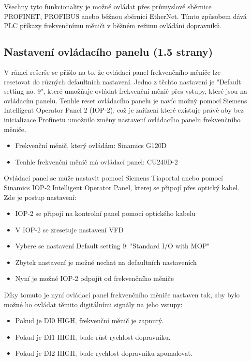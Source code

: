 Všechny tyto funkcionality je možné ovládat přes průmyslové sběrnice PROFINET, PROFIBUS anebo běžnou sběrnicí EtherNet. Tímto způsobem dává PLC příkazy frekvenčnímu měniči v běžném režimu ovládání dopravníků.

\oldtext

\subsection{Nastavení ovládacího panelu (1.5 strany)}\label{sec:NastaveniOvladacihoPanelu}

V rámci rešerše se přišlo na to, že ovládací panel frekvenčního měniče lze resetovat do různých defaultních nastavení. Jedno z těchto nastavení je "Default setting no. 9", které umožňuje ovládat frekvenční měnič přes vstupy, které jsou na ovládacím panelu. Tenhle reset ovládacího panelu je navíc možný pomocí Siemens Intelligent Operator Panel 2 (IOP-2), což je zařízení které existuje právě aby bez inicializace Profinetu umožnilo změny nastavení ovládacího panelu frekvenčního měniče.


\begin{itemize}
	\item Frekvenční měnič, který ovládám: Sinamics G120D
	\item Tenhle frekvenční měnič má ovládací panel: CU240D-2 \cite{SiemensG120DGettingStarted}
\end{itemize}


Ovládací panel se může nastavit pomocí Siemens Tiaportal anebo pomocí Sinamics IOP‑2 Intelligent Operator Panel, kterej se připojí přes optický kabel. Zde je postup nastavení:\cite{SiemensG120DGettingStarted}
\begin{itemize}
    \item IOP-2 se připojí na kontrolní panel pomocí optického kabelu
    \item V IOP-2 se zresetuje nastavení VFD
    \item Vybere se nastavení Default setting 9: "Standard I/O with MOP"
    \item Zbytek nastavení je možné nechat na defaultních nastaveních
    \item Nyní je možné IOP-2 odpojit od frekvenčního měniče
\end{itemize}

Díky tomuto je nyní ovládací panel frekvenčního měniče nastaven tak, aby bylo možné ho ovládat těmito digitálními signály na jeho vstupy:
\begin{itemize}
    \item Pokud je DI0 HIGH, frekvenční měnič je zapnutý.
    \item Pokud je DI1 HIGH, bude růst rychlost dopravníku.
    \item Pokud je DI2 HIGH, bude rychlost dopravníku zpomalovat.
\end{itemize}

